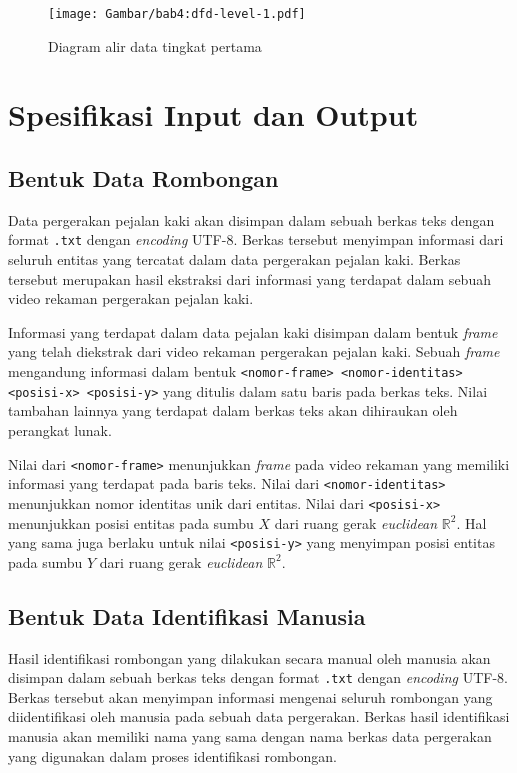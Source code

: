 \begin{figure}[t]
    \centering
    \texttt{[image: Gambar/bab4:dfd-level-1.pdf]}
    \caption{Diagram alir data tingkat pertama}
    \label{bab4:dfd-level-1}
\end{figure}

\section{Spesifikasi Input dan Output}
\label{sec:input-output}

\subsection{Bentuk Data Rombongan}
\label{sec:input}

Data pergerakan pejalan kaki akan disimpan dalam sebuah berkas teks dengan format \texttt{.txt} dengan \textit{encoding} UTF-8. Berkas tersebut menyimpan informasi dari seluruh entitas yang tercatat dalam data pergerakan pejalan kaki. Berkas tersebut merupakan hasil ekstraksi dari informasi yang terdapat dalam sebuah video rekaman pergerakan pejalan kaki.

Informasi yang terdapat dalam data pejalan kaki disimpan dalam bentuk \textit{frame} yang telah diekstrak dari video rekaman pergerakan pejalan kaki. Sebuah \textit{frame} mengandung informasi dalam bentuk \texttt{<nomor-frame> <nomor-identitas> <posisi-x> <posisi-y>} yang ditulis dalam satu baris pada berkas teks. Nilai tambahan lainnya yang terdapat dalam berkas teks akan dihiraukan oleh perangkat lunak.

Nilai dari \texttt{<nomor-frame>} menunjukkan \textit{frame} pada video rekaman yang memiliki informasi yang terdapat pada baris teks. Nilai dari \texttt{<nomor-identitas>} menunjukkan nomor identitas unik dari entitas. Nilai dari \texttt{<posisi-x>} menunjukkan posisi entitas pada sumbu $X$ dari ruang gerak \textit{euclidean} $\mathbb{R}^2$. Hal yang sama juga berlaku untuk nilai \texttt{<posisi-y>} yang menyimpan posisi entitas pada sumbu $Y$ dari ruang gerak \textit{euclidean} $\mathbb{R}^2$.

\subsection{Bentuk Data Identifikasi Manusia}
\label{sec:human-identification}

Hasil identifikasi rombongan yang dilakukan secara manual oleh manusia akan disimpan dalam sebuah berkas teks dengan format \texttt{.txt} dengan \textit{encoding} UTF-8. Berkas tersebut akan menyimpan informasi mengenai seluruh rombongan yang diidentifikasi oleh manusia pada sebuah data pergerakan. Berkas hasil identifikasi manusia akan memiliki nama yang sama dengan nama berkas data pergerakan yang digunakan dalam proses identifikasi rombongan. 

